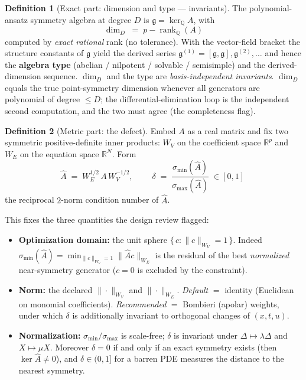 \documentclass[11pt]{article}
\theoremstyle{definition}
\newtheorem{definition}{Definition}[section]
\theoremstyle{remark}
\newcommand{\R}{\mathbb{R}}
\newcommand{\Q}{\mathbb{Q}}
\newcommand{\g}{\mathfrak{g}}
\newcommand{\X}{X}
\begin{document}
\begin{definition}[Exact part: dimension and type --- invariants]
The polynomial-ansatz symmetry algebra at degree $D$ is $\g=\ker_\Q A$, with
\[
\dim_D \;=\; p-\operatorname{rank}_\Q(A)
\]
computed by \emph{exact rational} rank (no tolerance). With the vector-field bracket the structure
constants of $\g$ yield the derived series $\g^{(1)}=[\g,\g],\g^{(2)},\dots$ and hence the
\textbf{algebra type} (abelian / nilpotent / solvable / semisimple) and the derived-dimension
sequence. $\dim_D$ and the type are \emph{basis-independent invariants}. $\dim_D$ equals the true
point-symmetry dimension whenever all generators are polynomial of degree $\le D$; the
differential-elimination loop is the independent second computation, and the two must agree (the
completeness flag).
\end{definition}

\begin{definition}[Metric part: the defect]
Embed $A$ as a real matrix and fix two symmetric positive-definite inner products: $W_V$ on the
coefficient space $\R^{p}$ and $W_E$ on the equation space $\R^{N}$. Form
\[
\hat A \;=\; W_E^{1/2}\,A\,W_V^{-1/2},\qquad
\boxed{\;\delta \;=\; \frac{\sigma_{\min}(\hat A)}{\sigma_{\max}(\hat A)}\;\in[0,1]\;}
\]
the reciprocal $2$-norm condition number of $\hat A$.
\end{definition}

\noindent This fixes the three quantities the design review flagged:
\begin{itemize}[nosep]
  \item \textbf{Optimization domain:} the unit sphere $\{\,c:\|c\|_{W_V}=1\,\}$. Indeed
        $\sigma_{\min}(\hat A)=\min_{\|c\|_{W_V}=1}\|\hat A c\|_{W_E}$ is the residual of the best
        \emph{normalized} near-symmetry generator ($c=0$ is excluded by the constraint).
  \item \textbf{Norm:} the declared $\|\cdot\|_{W_V}$ and $\|\cdot\|_{W_E}$. \emph{Default} $=$
        identity (Euclidean on monomial coefficients). \emph{Recommended} $=$ Bombieri (apolar)
        weights, under which $\delta$ is additionally invariant to orthogonal changes of
        $(x,t,u)$.
  \item \textbf{Normalization:} $\sigma_{\min}/\sigma_{\max}$ is scale-free; $\delta$ is invariant
        under $\Delta\mapsto\lambda\Delta$ and $\X\mapsto\mu\X$. Moreover $\delta=0$ if and only if
        an exact symmetry exists (then $\ker\hat A\neq 0$), and $\delta\in(0,1]$ for a barren PDE
        measures the distance to the nearest symmetry.
\end{itemize}
\end{document}

